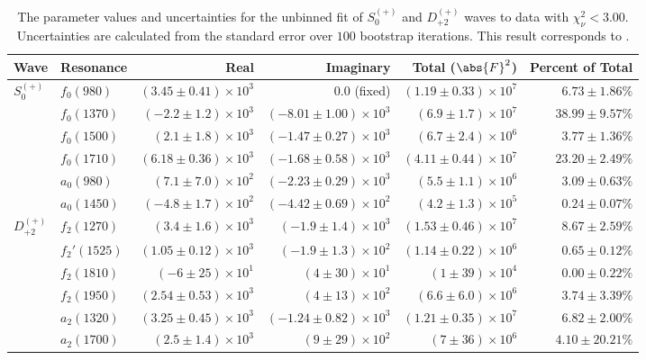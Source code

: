 \begin{table}[ht]
    \begin{center}
        \begin{tabular}{llrrrr}\toprule
        Wave & Resonance & Real & Imaginary & Total ($\abs{F}^2$) & Percent of Total \\\midrule
$S_{0}^{(+)}$ & $f_{0}(980)$ & $(3.45 \pm 0.41) \times 10^{3}$ & $0.0$ (fixed) & $(1.19 \pm 0.33) \times 10^{7}$ & $6.73 \pm 1.86 \%$ \\
 & $f_{0}(1370)$ & $(-2.2 \pm 1.2) \times 10^{3}$ & $(-8.01 \pm 1.00) \times 10^{3}$ & $(6.9 \pm 1.7) \times 10^{7}$ & $38.99 \pm 9.57 \%$ \\
 & $f_{0}(1500)$ & $(2.1 \pm 1.8) \times 10^{3}$ & $(-1.47 \pm 0.27) \times 10^{3}$ & $(6.7 \pm 2.4) \times 10^{6}$ & $3.77 \pm 1.36 \%$ \\
 & $f_{0}(1710)$ & $(6.18 \pm 0.36) \times 10^{3}$ & $(-1.68 \pm 0.58) \times 10^{3}$ & $(4.11 \pm 0.44) \times 10^{7}$ & $23.20 \pm 2.49 \%$ \\
 & $a_{0}(980)$ & $(7.1 \pm 7.0) \times 10^{2}$ & $(-2.23 \pm 0.29) \times 10^{3}$ & $(5.5 \pm 1.1) \times 10^{6}$ & $3.09 \pm 0.63 \%$ \\
 & $a_{0}(1450)$ & $(-4.8 \pm 1.7) \times 10^{2}$ & $(-4.42 \pm 0.69) \times 10^{2}$ & $(4.2 \pm 1.3) \times 10^{5}$ & $0.24 \pm 0.07 \%$ \\
$D_{+2}^{(+)}$ & $f_{2}(1270)$ & $(3.4 \pm 1.6) \times 10^{3}$ & $(-1.9 \pm 1.4) \times 10^{3}$ & $(1.53 \pm 0.46) \times 10^{7}$ & $8.67 \pm 2.59 \%$ \\
 & $f_{2}'(1525)$ & $(1.05 \pm 0.12) \times 10^{3}$ & $(-1.9 \pm 1.3) \times 10^{2}$ & $(1.14 \pm 0.22) \times 10^{6}$ & $0.65 \pm 0.12 \%$ \\
 & $f_{2}(1810)$ & $(-6 \pm 25) \times 10^{1}$ & $(4 \pm 30) \times 10^{1}$ & $(1 \pm 39) \times 10^{4}$ & $0.00 \pm 0.22 \%$ \\
 & $f_{2}(1950)$ & $(2.54 \pm 0.53) \times 10^{3}$ & $(4 \pm 13) \times 10^{2}$ & $(6.6 \pm 6.0) \times 10^{6}$ & $3.74 \pm 3.39 \%$ \\
 & $a_{2}(1320)$ & $(3.25 \pm 0.45) \times 10^{3}$ & $(-1.24 \pm 0.82) \times 10^{3}$ & $(1.21 \pm 0.35) \times 10^{7}$ & $6.82 \pm 2.00 \%$ \\
 & $a_{2}(1700)$ & $(2.5 \pm 1.4) \times 10^{3}$ & $(9 \pm 29) \times 10^{2}$ & $(7 \pm 36) \times 10^{6}$ & $4.10 \pm 20.21 \%$ \\\bottomrule
        \end{tabular}
    \caption{The parameter values and uncertainties for the unbinned fit of $S_{0}^{(+)}$ and $D_{+2}^{(+)}$ waves to data with $\chi^2_\nu < 3.00$. Uncertainties are calculated from the standard error over $100$ bootstrap iterations. This result corresponds to .}\label{tab:unbinned-fit-chisqdof-3.0-Sp0p-Dp2p}
    \end{center}
\end{table}
